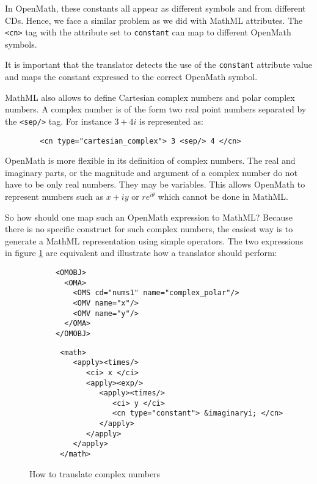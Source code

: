 In OpenMath, these constants all appear as different symbols and from
different CDs.  Hence, we face a similar problem as we did with MathML
attributes. The \verb|<cn>| tag with the attribute set to
\verb|constant| can map to different OpenMath symbols.

It is important that the translator detects the use of the
\verb|constant| attribute value and maps the constant expressed to the
correct OpenMath symbol.

MathML also allows to define Cartesian complex numbers and polar
complex numbers.  A complex number is of the form two real point
numbers separated by the \verb|<sep/>| tag. For instance $3+4i$ is
represented as:

\begin{verbatim}
        <cn type="cartesian_complex"> 3 <sep/> 4 </cn>
\end{verbatim}

OpenMath is more flexible in its definition of complex numbers. The
real and imaginary parts, or the magnitude and argument of a complex
number do not have to be only real numbers. They may be variables. This
allows OpenMath to represent numbers such as $x+iy$ or $re^{i\theta}$
which cannot be done in MathML.

So how should one map such an OpenMath expression to MathML? Because
there is no specific construct for such complex numbers, the easiest
way is to generate a MathML representation using simple operators. The
two expressions in figure \ref{compls} are equivalent and illustrate how a
translator should perform:

\begin{figure}[h]

\begin{verbatim}
      <OMOBJ>
        <OMA>
          <OMS cd="nums1" name="complex_polar"/>
          <OMV name="x"/>
          <OMV name="y"/>
        </OMA>
      </OMOBJ> 
\end{verbatim}

\begin{verbatim}
       <math>
          <apply><times/>
             <ci> x </ci>
             <apply><exp/>
                <apply><times/>
                   <ci> y </ci>
                   <cn type="constant"> &imaginaryi; </cn>
                </apply>
             </apply>
          </apply>
       </math> 
\end{verbatim}

\caption{How to translate complex numbers}
\label{compls}
\end{figure}

